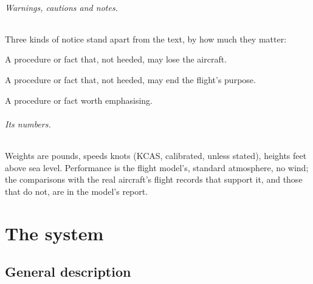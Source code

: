 \documentclass[11pt,a4paper,oneside]{book}
\begin{document}
\paragraph{Warnings, cautions and notes.} Three kinds of notice stand apart from the text, by how much they matter:
\begin{warning}
A procedure or fact that, not heeded, may lose the aircraft.
\end{warning}
\begin{caution}
A procedure or fact that, not heeded, may end the flight's purpose.
\end{caution}
\begin{note}
A procedure or fact worth emphasising.
\end{note}

\paragraph{Its numbers.} Weights are pounds, speeds knots (KCAS, calibrated, unless stated), heights feet above sea
level. Performance is the flight model's, standard atmosphere, no wind; the comparisons with the real aircraft's
flight records that support it, and those that do not, are in the model's report.

\tableofcontents

\mainmatter
\part{The system}
\chapter{General description}\label{ch:general}
\end{document}
